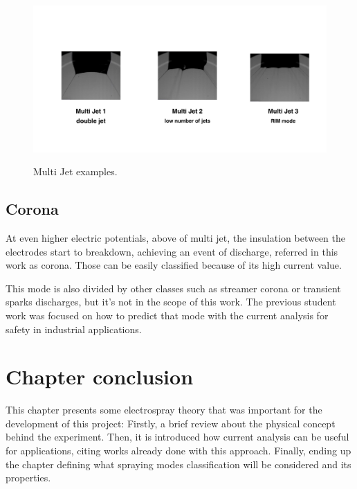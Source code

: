   \begin{figure}[H]
      \center
      \includegraphics[width=15cm]{Figuras/april/multjt.png}
      \label{fig:multijt}
      \caption{Multi Jet examples.}
  \end{figure}



\subsection{Corona}
\label{subsec:Corona}

At even higher electric potentials, above of multi jet, the insulation between the electrodes start to breakdown, achieving an event of discharge, referred in this work as corona.
Those can be easily classified because of its high current value. 

This mode is also divided by other classes such as streamer corona or transient sparks discharges, but it's not in the scope of this work. 
The previous student work was focused on how to predict that mode with the current analysis for safety in industrial applications.



\section{Chapter conclusion}

This chapter presents some electrospray theory that was important for the development of this project:
Firstly, a brief review about the physical concept behind the experiment. 
Then, it is introduced how current analysis can be useful for applications, citing works already done with this approach.
Finally, ending up the chapter defining what spraying modes classification will be considered and its properties.

\clearpage